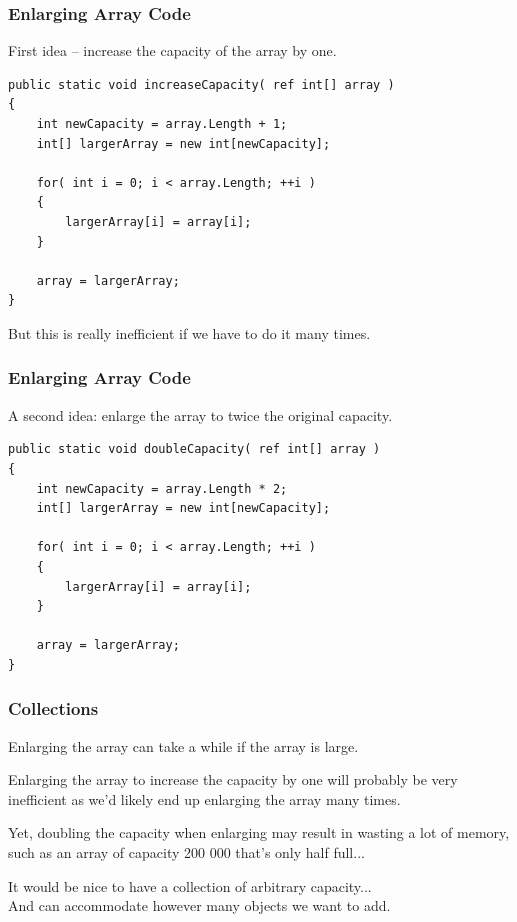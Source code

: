 \begin{frame}[fragile]
\frametitle{Enlarging Array Code}

First idea -- increase the capacity of the array by one.

\begin{verbatim}
public static void increaseCapacity( ref int[] array )
{
    int newCapacity = array.Length + 1;
    int[] largerArray = new int[newCapacity];
    
    for( int i = 0; i < array.Length; ++i )
    {
        largerArray[i] = array[i];
    }
    
    array = largerArray;
}
\end{verbatim}

But this is really inefficient if we have to do it many times.

\end{frame}


\begin{frame}[fragile]
\frametitle{Enlarging Array Code}

A second idea: enlarge the array to twice the original capacity.

\begin{verbatim}
public static void doubleCapacity( ref int[] array )
{
    int newCapacity = array.Length * 2;
    int[] largerArray = new int[newCapacity];
    
    for( int i = 0; i < array.Length; ++i )
    {
        largerArray[i] = array[i];
    }
    
    array = largerArray;
}
\end{verbatim}

\end{frame}



\begin{frame}
\frametitle{Collections}

Enlarging the array can take a while if the array is large.

Enlarging the array to increase the capacity by one will probably be very inefficient as we'd likely end up enlarging the array many times.

Yet, doubling the capacity when enlarging may result in wasting a lot of memory, such as an array of capacity 200 000 that's only half full...

It would be nice to have a \alert{collection} of arbitrary capacity...\\
\quad And can accommodate however many objects we want to add.



\end{frame}



